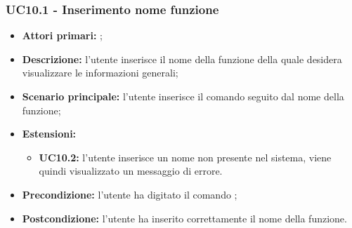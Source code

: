 \subsubsection{UC10.1 - Inserimento nome funzione}
\begin{itemize}
	\item \textbf{Attori primari:} \ua{};
	\item \textbf{Descrizione:} l’utente inserisce il nome della funzione della quale desidera visualizzare le informazioni generali;
	\item \textbf{Scenario principale:} l'utente inserisce il comando \info{} seguito dal nome della funzione;
	\item \textbf{Estensioni:} 
	\begin{itemize}
		\item \textbf{UC10.2:} l’utente inserisce un nome non presente nel sistema, viene quindi visualizzato un messaggio di errore.
	\end{itemize}
	\item \textbf{Precondizione:} l'utente ha digitato il comando \info{};
	\item \textbf{Postcondizione:} l’utente ha inserito correttamente il nome della funzione.
\end{itemize}